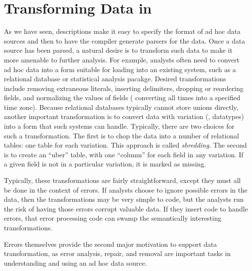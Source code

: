 \section{Transforming Data in \datatype{}}
\label{sec:data-transformation}

As we have seen, \datatype{} descriptions make it easy to specify the format of ad hoc data sources and then to have the \datatype{} compiler generate parsers for the data.
Once a data source has been parsed, a natural
desire is to transform such data to make it more amenable to further
analysis.  For example, analysts often need to convert ad hoc data
into a form suitable for loading into an existing system, such as a
relational database or statistical analysis pacakge.  Desired
transformations include removing extraneous literals, inserting
delimiters, dropping or reordering fields, and normalizing the values
of fields (\eg{} converting all times into a specified time zone).
Because relational databases typically cannot store unions directly,
another important transformation is to convert data with variation
(\ie{}, datatypes) into a form that such systems can handle.  Typically,
there are two choices for such a transformation.  The first is to chop
the data into a number of relational tables: one table for each
variation.  This approach is called \textit{shredding}. The second is
to create an ``uber'' table, with one ``column'' for each field in any
variation.  If a given field is not in a particular variation, it is
marked as missing.

Typically, these transformations are fairly straightforward, except
they must all be done in the context of errors.  If analysts choose to
ignore possible errors in the data, then the transformations may be
very simple to code, but the analysts run the risk of having those
errors corrupt valuable data.  If they insert code to handle errors,
that error processing code can swamp the semantically interesting
transformations. 

Errors themselves provide the second major motivation to support data transformation, as error analysis, repair, and removal are important tasks in understanding and using an ad hoc data source.

